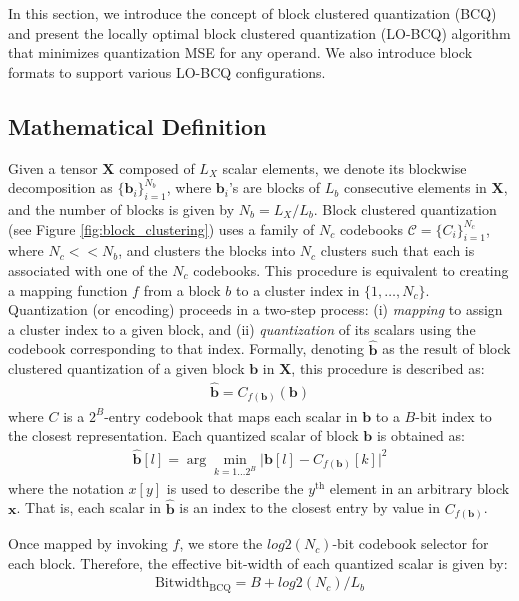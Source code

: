 In this section, we introduce the concept of block clustered quantization (BCQ) and present the locally optimal block clustered quantization (LO-BCQ) algorithm that minimizes quantization MSE for any operand. We also introduce block formats to support various LO-BCQ configurations.

\subsection{Mathematical Definition}
\label{subsec:bcq} 

Given a tensor $\bm{X}$ composed of $L_X$ scalar elements, we denote its blockwise decomposition as $\{\bm{b}_i\}_{i=1}^{N_b}$, where $\bm{b}_i$'s are blocks of $L_b$ consecutive elements in $\bm{X}$, and the number of blocks is given by $N_b={L_X}/{L_b}$. Block clustered quantization (see Figure \ref{fig:block_clustering}) uses a family of $N_c$ codebooks $\mathcal{C} = \{C_i\}_{i=1}^{N_c}$, where $N_c << N_b$, and clusters the blocks into $N_c$ clusters such that each is associated with one of the $N_c$ codebooks. This procedure is equivalent to creating a mapping function $f$ from a block $b$ to a cluster index in $\{1,\ldots, N_c\}$. Quantization (or encoding) proceeds in a two-step process: (i) \emph{mapping} to assign a cluster index to a given block, and (ii) \emph{quantization} of its scalars using the codebook corresponding to that index. Formally, denoting $\hat{\bm{b}}$ as the result of block clustered quantization of a given block $\bm{b}$ in $\bm{X}$, this procedure is described as:
\begin{align}
    \label{eq:clustered_quantization_definition}
    \hat{\bm{b}} = C_{f(\bm{b})}(\bm{b})
\end{align}
where $C$ is a $2^B$-entry codebook that maps each scalar in $\bm{b}$ to a $B$-bit index to the closest representation. Each quantized scalar of block $\bm{b}$ is obtained as:
\begin{align}
\label{eq:bcq_encoding_of_scalar}
    \hat{\bm{b}}[l] = \arg \min_{k = 1 \ldots 2^B} \lvert \bm{b}[l] - C_{f(\bm{b})}[k] \rvert^2 
\end{align}
where the notation $x[y]$ is used to describe the $y^{\text{th}}$ element in an arbitrary block $\bm{x}$. That is, each scalar in $\hat{\bm{b}}$ is an index to the closest entry by value in $C_{f(\bm{b})}$.

Once mapped by invoking $f$, we store the $log2(N_c)$-bit codebook selector for each block. Therefore, the effective bit-width of each quantized scalar is given by:
\begin{align}
\label{eq:bitwidth_bcq}
    \mathrm{Bitwidth}_{ \mathrm{BCQ}} = B + {log2(N_c)}/{L_b}
\end{align}

